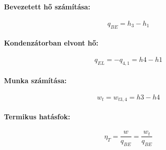 \paragraph{Bevezetett hő számítása:}
	\begin{equation}
		q_{BE} = h_3 - h_1
	\end{equation}
\paragraph{Kondenzátorban elvont hő:}
	\begin{equation}
		q_{EL} = - q_{4,1} = h4 - h1
	\end{equation}
\paragraph{Munka számítása:}
	\begin{equation}
		w_t = w_{t3,4} = h3-h4
	\end{equation}
\paragraph{Termikus hatásfok:}
	\begin{equation}
		\eta_T = \frac{w}{q_{BE}} = \frac{w_t}{q_{BE}}
	\end{equation}